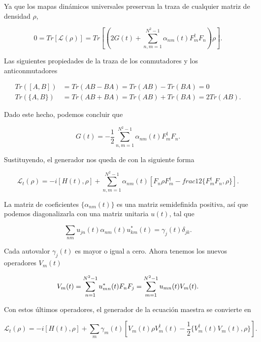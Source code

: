 Ya que los mapas dinámicos universales preservan la traza de cualquier matriz de densidad $\rho$,

\begin{equation}
    0 = Tr[\mathcal{L}(\rho)] = Tr\left[ \left(2G(t) + \sum_{n,m=1}^{N^2-1} \alpha_{nm}(t) F_m^\dagger F_n \right) \rho \right] .
\end{equation}

Las siguientes propiedades de la traza de los conmutadores y los anticonmutadores

\begin{align}
    Tr([A,B]) &= Tr(AB - BA) = Tr(AB) - Tr(BA) = 0 \\
    Tr(\{A,B\}) &= Tr(AB + BA) = Tr(AB) + Tr(BA) = 2 Tr(AB) .
\end{align}

Dado este hecho, podemos concluir que 

\begin{equation}
    G(t) = - \frac{1}{2} \sum_{n,m=1}^{N^2-1} \alpha_{nm}(t) F_m^\dagger F_n .
\end{equation}

Sustituyendo, el generador nos queda de con la siguiente forma

\begin{equation}
    \mathcal{L}_t(\rho) = -i [H(t), \rho] + \sum_{n,m=1}^{N^2-1} \alpha_{nm}(t) \left[F_n \rho F_m^\dagger - frac{1}{2} \{F_m^\dagger F_n, \rho\}\right] .
\end{equation}

La matriz de coeficientes $\{\alpha_{nm}(t)\}$ es una matriz semidefinida positiva, así que podemos diagonalizarla con una matriz unitaria $u(t)$, tal que

\begin{equation}
    \sum_{nm} u_{jn}(t) \alpha_{nm}(t) u_{km}^*(t) = \gamma_j(t) \delta_{jk} .
\end{equation}

Cada autovalor $\gamma_j(t)$ es mayor o igual a cero. Ahora tenemos los nuevos operadores $V_m(t)$

\begin{equation}
    V_m(t) = \sum_{n=1}^{N^2-1} u_{mn}^*(t) F_n \\
    F_j = \sum_{m=1}^{N^2-1} u_{mn}(t) V_m(t) .
\end{equation}

Con estos últimos operadores, el generador de la ecuación maestra se convierte en

\begin{equation}
    \mathcal{L}_t(\rho) = -i [H(t), \rho] + \sum_m \gamma_m(t) \left[ V_m(t) \rho V_m^\dagger(t) - \frac{1}{2} \{V_m^\dagger(t) V_m(t), \rho\}\right] .
\end{equation}

